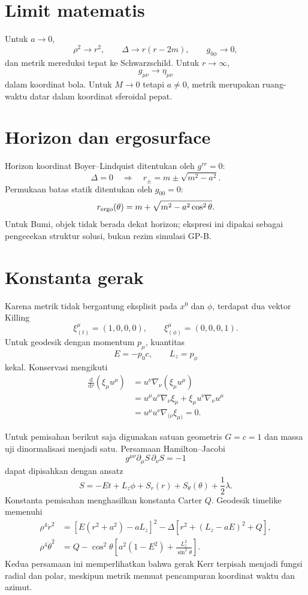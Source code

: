 \documentclass[12pt,a4paper]{report}
\newcommand{\dd}{\mathrm{d}}
\newcommand{\pd}{\partial}
\begin{document}
\section{Limit matematis}

Untuk $a\to0$,
\[
 \rho^2\to r^2,\qquad\Delta\to r(r-2m),\qquad g_{0\phi}\to0,
\]
dan metrik mereduksi tepat ke Schwarzschild. Untuk $r\to\infty$,
\[
 g_{\mu\nu}\to\eta_{\mu\nu}
\]
dalam koordinat bola. Untuk $M\to0$ tetapi $a\ne0$, metrik merupakan ruang-waktu
datar dalam koordinat sferoidal pepat.

\section{Horizon dan ergosurface}

Horizon koordinat Boyer--Lindquist ditentukan oleh $g^{rr}=0$:
\[
 \Delta=0
 \quad\Longrightarrow\quad
 r_\pm=m\pm\sqrt{m^2-a^2}.
\]
Permukaan batas statik ditentukan oleh $g_{00}=0$:
\[
 r_{\rm ergo}(\theta)=m+\sqrt{m^2-a^2\cos^2\theta}.
\]
Untuk Bumi, objek tidak berada dekat horizon; ekspresi ini dipakai sebagai
pengecekan struktur solusi, bukan rezim simulasi GP-B.

\section{Konstanta gerak}

Karena metrik tidak bergantung eksplisit pada $x^0$ dan $\phi$, terdapat dua
vektor Killing
\[
 \xi_{(t)}^\mu=(1,0,0,0),
 \qquad
 \xi_{(\phi)}^\mu=(0,0,0,1).
\]
Untuk geodesik dengan momentum $p_\mu$, kuantitas
\[
 E=-p_0c,
 \qquad L_z=p_\phi
\]
kekal. Konservasi mengikuti
\begin{align}
 \frac{\dd}{\dd\tau}(\xi_\mu u^\mu)
 &=u^\nu\nabla_\nu(\xi_\mu u^\mu)\\
 &=u^\mu u^\nu\nabla_\nu\xi_\mu
 +\xi_\mu u^\nu\nabla_\nu u^\mu\\
 &=u^\mu u^\nu\nabla_{(\nu}\xi_{\mu)}=0.
\end{align}

Untuk pemisahan berikut saja digunakan satuan geometris $G=c=1$ dan massa uji
dinormalisasi menjadi satu. Persamaan Hamilton--Jacobi
\[
 g^{\mu\nu}\pd_\mu S\,\pd_\nu S=-1
\]
dapat dipisahkan dengan ansatz
\[
 S=-Et+L_z\phi+S_r(r)+S_\theta(\theta)+\frac12\lambda.
\]
Konstanta pemisahan menghasilkan konstanta Carter $Q$. Geodesik timelike memenuhi
\begin{align}
 \rho^4\dot r^2
 &=\left[E(r^2+a^2)-aL_z\right]^2
 -\Delta\left[r^2+(L_z-aE)^2+Q\right],\\
 \rho^4\dot\theta^2
 &=Q-\cos^2\theta\left[a^2(1-E^2)
 +\frac{L_z^2}{\sin^2\theta}\right].
\end{align}
Kedua persamaan ini memperlihatkan bahwa gerak Kerr terpisah menjadi fungsi radial
dan polar, meskipun metrik memuat pencampuran koordinat waktu dan azimut.
\end{document}
